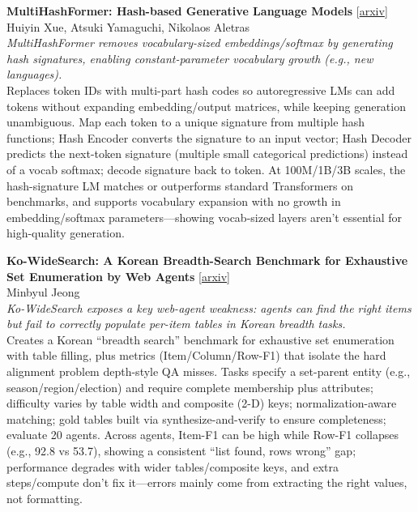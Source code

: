 \documentclass[12pt,letterpaper]{article}
\begin{document}
\medskip

{\small\textbf{MultiHashFormer: Hash-based Generative Language Models}} {\scriptsize[\href{https://arxiv.org/abs/2606.28057}{arxiv}]}\\
{\scriptsize Huiyin Xue, Atsuki Yamaguchi, Nikolaos Aletras}\\

{\small\textit{MultiHashFormer removes vocabulary-sized embeddings/softmax by generating hash signatures, enabling constant-parameter vocabulary growth (e.g., new languages).}}\\[1pt]
{\footnotesize Replaces token IDs with multi-part hash codes so autoregressive LMs can add tokens without expanding embedding/output matrices, while keeping generation unambiguous. Map each token to a unique signature from multiple hash functions; Hash Encoder converts the signature to an input vector; Hash Decoder predicts the next-token signature (multiple small categorical predictions) instead of a vocab softmax; decode signature back to token. At 100M/1B/3B scales, the hash-signature LM matches or outperforms standard Transformers on benchmarks, and supports vocabulary expansion with no growth in embedding/softmax parameters---showing vocab-sized layers aren't essential for high-quality generation.}

\medskip

{\small\textbf{Ko-WideSearch: A Korean Breadth-Search Benchmark for Exhaustive Set Enumeration by Web Agents}} {\scriptsize[\href{https://arxiv.org/abs/2606.27595}{arxiv}]}\\
{\scriptsize Minbyul Jeong}\\

{\small\textit{Ko-WideSearch exposes a key web-agent weakness: agents can find the right items but fail to correctly populate per-item tables in Korean breadth tasks.}}\\[1pt]
{\footnotesize Creates a Korean ``breadth search'' benchmark for exhaustive set enumeration with table filling, plus metrics (Item/Column/Row-F1) that isolate the hard alignment problem depth-style QA misses. Tasks specify a set-parent entity (e.g., season/region/election) and require complete membership plus attributes; difficulty varies by table width and composite (2-D) keys; normalization-aware matching; gold tables built via synthesize-and-verify to ensure completeness; evaluate 20 agents. Across agents, Item-F1 can be high while Row-F1 collapses (e.g., 92.8 vs 53.7), showing a consistent ``list found, rows wrong'' gap; performance degrades with wider tables/composite keys, and extra steps/compute don't fix it---errors mainly come from extracting the right values, not formatting.}
\end{document}
